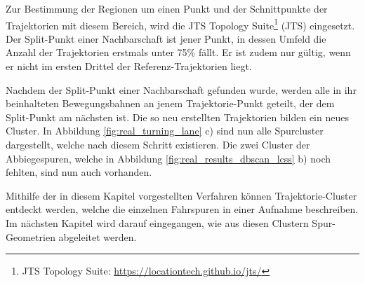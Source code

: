 Zur Bestimmung der Regionen um einen Punkt und der Schnittpunkte der Trajektorien mit diesem Bereich,
wird die JTS Topology Suite\footnote{JTS Topology Suite: \url{https://locationtech.github.io/jts/}}
(JTS) eingesetzt. Der Split-Punkt einer Nachbarschaft ist jener Punkt, in dessen Umfeld die Anzahl der
Trajektorien erstmals unter 75\% fällt. Er ist zudem nur gültig, wenn er nicht im ersten Drittel der
Referenz-Trajektorien liegt.

Nachdem der Split-Punkt einer Nachbarschaft gefunden wurde, werden alle in ihr beinhalteten Bewegungsbahnen
an jenem Trajektorie-Punkt geteilt, der dem Split-Punkt am nächsten ist.
Die so neu erstellten Trajektorien bilden ein neues Cluster. In Abbildung \ref{fig:real_turning_lane} c)
sind nun alle Spurcluster dargestellt, welche nach diesem Schritt existieren. Die zwei Cluster der Abbiegespuren,
welche in Abbildung \ref{fig:real_results_dbscan_lcss} b) noch fehlten, sind nun auch vorhanden.

Mithilfe der in diesem Kapitel vorgestellten Verfahren können Trajektorie-Cluster entdeckt werden, welche
die einzelnen Fahrspuren in einer Aufnahme beschreiben. Im nächsten Kapitel wird darauf eingegangen, wie
aus diesen Clustern Spur-Geometrien abgeleitet werden.